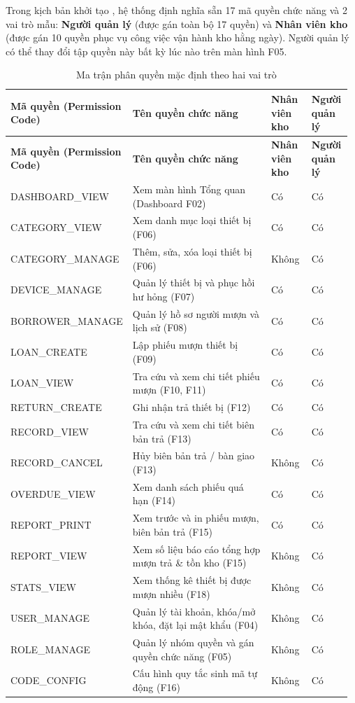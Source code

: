 Trong kịch bản khởi tạo , hệ thống định nghĩa sẵn 17 mã quyền chức năng và 2 vai trò mẫu: \textbf{Người quản lý} (được gán toàn bộ 17 quyền) và \textbf{Nhân viên kho} (được gán 10 quyền phục vụ công việc vận hành kho hằng ngày). Người quản lý có thể thay đổi tập quyền này bất kỳ lúc nào trên màn hình F05.


{\small\setlength{\tabcolsep}{3pt}\renewcommand{\arraystretch}{1.25}
\begin{longtable}{|>{\raggedright\arraybackslash}p{0.240\linewidth}|>{\raggedright\arraybackslash}p{0.472\linewidth}|>{\raggedright\arraybackslash}p{0.129\linewidth}|>{\raggedright\arraybackslash}p{0.129\linewidth}|}
\caption{Ma trận phân quyền mặc định theo hai vai trò}\\
\hline
\rowcolor{gray!25}\textbf{\textbf{Mã quyền (Permission Code)}} & \textbf{\textbf{Tên quyền chức năng}} & \textbf{\textbf{Nhân viên kho}} & \textbf{\textbf{Người quản lý}} \\ \hline
\endfirsthead
\hline
\rowcolor{gray!25}\textbf{\textbf{Mã quyền (Permission Code)}} & \textbf{\textbf{Tên quyền chức năng}} & \textbf{\textbf{Nhân viên kho}} & \textbf{\textbf{Người quản lý}} \\ \hline
\endhead
\hline\endfoot
DASHBOARD\_VIEW & Xem màn hình Tổng quan (Dashboard F02) & Có & Có \\ \hline
CATEGORY\_VIEW & Xem danh mục loại thiết bị (F06) & Có & Có \\ \hline
CATEGORY\_MANAGE & Thêm, sửa, xóa loại thiết bị (F06) & Không & Có \\ \hline
DEVICE\_MANAGE & Quản lý thiết bị và phục hồi hư hỏng (F07) & Có & Có \\ \hline
BORROWER\_MANAGE & Quản lý hồ sơ người mượn và lịch sử (F08) & Có & Có \\ \hline
LOAN\_CREATE & Lập phiếu mượn thiết bị (F09) & Có & Có \\ \hline
LOAN\_VIEW & Tra cứu và xem chi tiết phiếu mượn (F10, F11) & Có & Có \\ \hline
RETURN\_CREATE & Ghi nhận trả thiết bị (F12) & Có & Có \\ \hline
RECORD\_VIEW & Tra cứu và xem chi tiết biên bản trả (F13) & Có & Có \\ \hline
RECORD\_CANCEL & Hủy biên bản trả / bàn giao (F13) & Không & Có \\ \hline
OVERDUE\_VIEW & Xem danh sách phiếu quá hạn (F14) & Có & Có \\ \hline
REPORT\_PRINT & Xem trước và in phiếu mượn, biên bản trả (F15) & Có & Có \\ \hline
REPORT\_VIEW & Xem số liệu báo cáo tổng hợp mượn trả \& tồn kho (F15) & Không & Có \\ \hline
STATS\_VIEW & Xem thống kê thiết bị được mượn nhiều (F18) & Không & Có \\ \hline
USER\_MANAGE & Quản lý tài khoản, khóa/mở khóa, đặt lại mật khẩu (F04) & Không & Có \\ \hline
ROLE\_MANAGE & Quản lý nhóm quyền và gán quyền chức năng (F05) & Không & Có \\ \hline
CODE\_CONFIG & Cấu hình quy tắc sinh mã tự động (F16) & Không & Có \\ \hline
\end{longtable}
}
